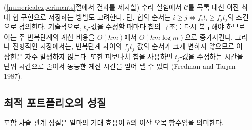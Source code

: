 \documentclass[11pt]{article} %
\newif\ifen
\theoremstyle{definition}
\theoremstyle{definition}
\begin{document}
\ifen 
In our numerical experiments, whose results are reported in section \ref{numericalexperiments},
we also explore the possibility of storing $\mathcal{C}$ as a binary max heap rather than a list. The heap is ordered according to the criterion $i \geq j \iff f_i t_i \geq f_j t_j$. Nominally, using a heap increases the cost of the main loop from $O(h m)$ to $O(hm \log m)$ because the heap is rebalanced when each $t_j$-value is updated. However, typical problem instances do not achieve this upper bound because the order of the $f_j t_j$-values changes only slightly between iterations. The cost of updating each $t_j$-value can be reduced to unit time using a Fibonacci heap (Fredman and Tarjan 1987), yielding the same overall computation time. 
\else
(\ref{numericalexperiments}절에서 결과를 제시할) 수리 실험에서 $\mathcal{C}$를 목록 대신 이진 최대 힙 구현으로 저장하는 방법도 고려한다. 단, 힙의 순서는 $i \geq j \iff f_i t_i \geq f_j t_j$의 조건으로 정의한다. 기술적으로, $t_j$-값을 수정할 때마다 힙의 구조를 다시 복구해야 하므로 이는 주 반복단계의 계산 비용을 $O(h m)$에서 $O(hm \log m)$으로 증가시킨다. 그러나 전형적인 시장에서는, 반복단계 사이의 $f_j t_j$-값의 순서가 크게 변하지 않으므로 이 상한은 자주 발생하지 않는다. 또한 피보나치 힙을 사용하면 $t_j$-값을 수정하는 시간을 단위 시간으로 줄여서 동등한 계산 시간을 얻어 낼 수 있다 (Fredman and Tarjan 1987). 
\fi


\ifen \subsection{Properties of the optimal portfolios} \else\subsection{최적 포트폴리오의 성질} \fi
\ifen The nestedness property implies that Alma's expected utility is a discretely concave function of $h$.
\else 포함 사슬 관계 성질은 알마의 기대 효용이 $h$의 이산 오목 함수임을 의미한다.\fi
\end{document}
